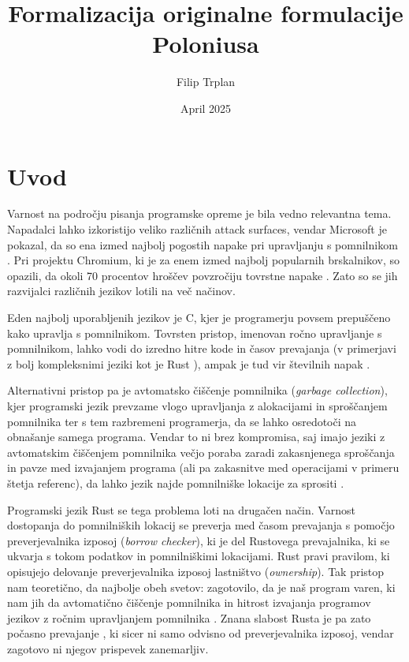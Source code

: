 \documentclass{article}
\title{Formalizacija originalne formulacije Poloniusa}
\author{Filip Trplan}
\date{April 2025}
\begin{document}
\maketitle

\section{Uvod}

Varnost na področju pisanja programske opreme je bila vedno relevantna tema. Napadalci lahko
izkoristijo veliko različnih attack surfaces, vendar Microsoft je pokazal, da so ena izmed najbolj pogostih
napake pri upravljanju s pomnilnikom \cite{Microsoft70Percent}. Pri projektu Chromium, ki je za enem
izmed najbolj popularnih brskalnikov, so opazili, da okoli 70 procentov hroščev povzročiju tovrstne napake \cite{MemorySafetya}.
Zato so se jih razvijalci različnih jezikov lotili na več načinov.

Eden najbolj uporabljenih jezikov je C, kjer je programerju povsem prepuščeno kako upravlja s pomnilnikom.
Tovrsten pristop, imenovan ročno upravljanje s pomnilnikom, lahko vodi do izredno
hitre kode in časov prevajanja (v primerjavi z bolj kompleksnimi jeziki kot je Rust \cite{glazarCodingRustBad2023}),
ampak je tud vir številnih napak \cite{MemorySafetya}.

Alternativni pristop pa je avtomatsko čiščenje pomnilnika (\textit{garbage collection}), kjer programski jezik
prevzame vlogo upravljanja z alokacijami in sproščanjem pomnilnika ter s tem razbremeni programerja, da se lahko
osredotoči na obnašanje samega programa. Vendar to ni brez kompromisa, saj imajo jeziki z avtomatskim čiščenjem
pomnilnika večjo poraba zaradi zakasnjenega sproščanja in pavze med izvajanjem programa
(ali pa zakasnitve med operacijami v primeru štetja referenc), da lahko jezik najde pomnilniške lokacije za
sprositi \cite{bakerListProcessingReal1978}.

Programski jezik Rust se tega problema loti na drugačen način. Varnost dostopanja do pomnilniških
lokacij se preverja med časom prevajanja s pomočjo preverjevalnika izposoj (\textit{borrow checker}), ki je
del Rustovega prevajalnika, ki se ukvarja s tokom podatkov in pomnilniškimi lokacijami.
Rust pravi pravilom, ki opisujejo delovanje preverjevalnika izposoj lastništvo (\textit{ownership}).
Tak pristop nam teoretično, da najbolje obeh svetov: zagotovilo, da je naš program varen, ki nam jih da
avtomatično čiščenje pomnilnika in hitrost izvajanja programov jezikov z ročnim upravljanjem pomnilnika \cite{klabnikRustProgrammingLanguage2023}.
Znana slabost Rusta je pa zato počasno prevajanje \cite{glazarCodingRustBad2023}, ki sicer ni samo odvisno od preverjevalnika izposoj,
vendar zagotovo ni njegov prispevek zanemarljiv.
\end{document}
